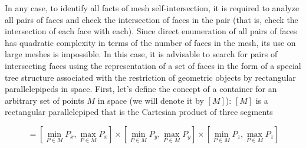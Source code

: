 \documentclass[
11pt,%
tightenlines,%
twoside,%
onecolumn,%
nofloats,%
nobibnotes,%
nofootinbib,%
superscriptaddress,%
noshowpacs,%
centertags]%
{revtex4-2}
\begin{document}
In any case, to identify all facts of mesh self-intersection, it is required to analyze all pairs of faces and check the intersection of faces in the pair (that is, check the intersection of each face with each).
Since direct enumeration of all pairs of faces has quadratic complexity in terms of the number of faces in the mesh, its use on large meshes is impossible.
In this case, it is advisable to search for pairs of intersecting faces using the representation of a set of faces in the form of a special tree structure associated with the restriction of geometric objects by rectangular parallelepipeds in space.
First, let's define the concept of a container for an arbitrary set of points $M$ in space (we will denote it by $[M]$): $[M]$ is a rectangular parallelepiped that is the Cartesian product of three segments

\begin{equation}
[M] = \left[\min_{P \in M}{P_x}, \max_{P \in M}{P_x}\right]
      \times \left[\min_{P \in M}{P_y}, \max_{P \in M}{P_y}\right]
      \times \left[\min_{P \in M}{P_z}, \max_{P \in M}{P_z}\right]
\end{equation}
\end{document}
